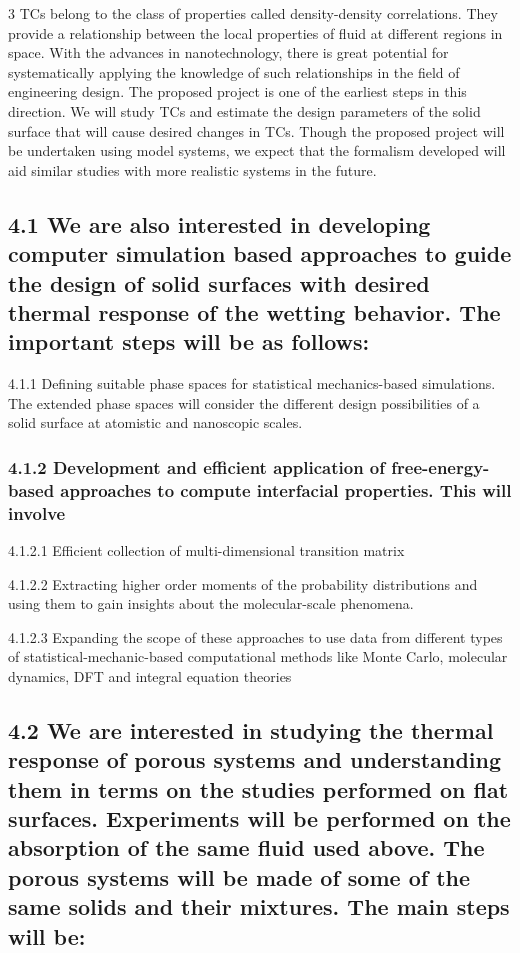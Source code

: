 \par 3 TCs belong to the class of properties called density-density correlations. They provide a relationship between the local properties of fluid at different regions in space. With the advances in nanotechnology, there is great potential for systematically applying the knowledge of such relationships in the field of engineering design. The proposed project is one of the earliest steps in this direction. We will study TCs and estimate the design parameters of the solid surface that will cause desired changes in TCs. Though the proposed project will be undertaken using model systems, we expect that the formalism developed will aid similar studies with more realistic systems in the future.\subsection{4.1 We are also interested in developing computer simulation based approaches to guide the design of solid surfaces with desired thermal response of the wetting behavior. The important steps will be as follows:}

\par 4.1.1 Defining suitable phase spaces for statistical mechanics-based simulations. The extended phase spaces will consider the different design possibilities of a solid surface at atomistic and nanoscopic scales.\subsubsection{4.1.2 Development and efficient application of free-energy-based approaches to compute interfacial properties. This will involve}

\par 4.1.2.1 Efficient collection of multi-dimensional transition matrix
\par 4.1.2.2 Extracting higher order moments of the probability distributions and using them to gain insights about the molecular-scale phenomena.
\par 4.1.2.3 Expanding the scope of these approaches to use data from different types of statistical-mechanic-based computational methods like Monte Carlo, molecular dynamics, DFT and integral equation theories\subsection{4.2 We are interested in studying the thermal response of porous systems and understanding them in terms on the studies performed on flat surfaces. Experiments will be performed on the absorption of the same fluid used above. The porous systems will be made of some of the same solids and their mixtures. The main steps will be:}

